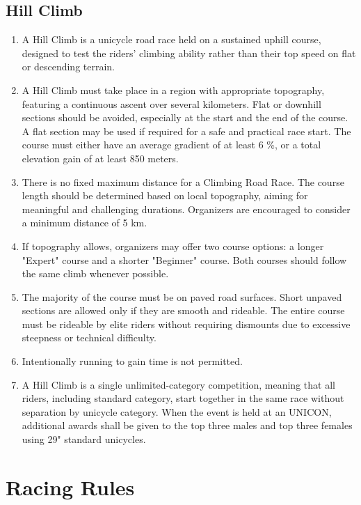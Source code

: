\subsection{Hill Climb}
	\begin{enumerate}[leftmargin=1.5em,labelsep=*]
		\item A Hill Climb is a unicycle road race held on a sustained uphill course, 
        designed to test the riders' climbing ability rather than their top speed on flat or descending terrain.
		\item A Hill Climb must take place in a region with appropriate topography, featuring a continuous ascent over several kilometers.
		Flat or downhill sections should be avoided, especially at the start and the end of the course.
		A flat section may be used if required for a safe and practical race start.
		The course must either have an average gradient of at least 6 \%, or a total elevation gain of at least 850 meters.
		\item There is no fixed maximum distance for a Climbing Road Race.
		The course length should be determined based on local topography, aiming for meaningful and challenging durations.
		Organizers are encouraged to consider a minimum distance of 5 km.
		\item If topography allows, organizers may offer two course options: a longer "Expert" course and a shorter "Beginner" course.
		Both courses should follow the same climb whenever possible.
		\item The majority of the course must be on paved road surfaces.
		Short unpaved sections are allowed only if they are smooth and rideable.
		The entire course must be rideable by elite riders without requiring dismounts due to excessive steepness or technical difficulty.
		\item Intentionally running to gain time is not permitted.
		\item A Hill Climb is a single unlimited-category competition, meaning that all riders, including standard category, 
        start together in the same race without separation by unicycle category.
		When the event is held at an UNICON, additional awards shall be given to the top three males and top three females using 29" standard unicycles.
	\end{enumerate}


\section{Racing Rules}

